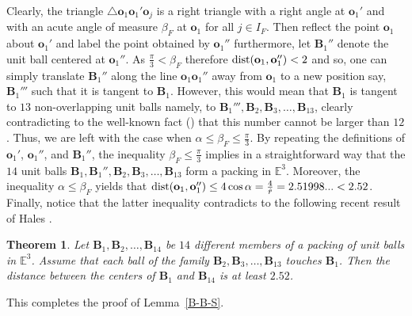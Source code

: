 \documentclass[10pt]{article}
\newtheorem{Theorem}{Theorem}
\numberwithin{Subcase}{Case}
\begin{document}
Clearly, the triangle $\triangle\mathbf{o}_1\mathbf{o}_1'\mathbf{o}_j$ is a right triangle with a right angle at $\mathbf{o}_1'$ and with an acute angle of measure $\beta_F$ at $\mathbf{o}_1$ for all $j\in I_F$. Then reflect the point $\mathbf{o}_1$ about $\mathbf{o}_1'$ and label the point obtained by $\mathbf{o}_1''$ furthermore, let $\mathbf{B}_1''$ denote the unit ball centered at $\mathbf{o}_1''$. As $\frac{\pi}{3}<\beta_F$ therefore ${\rm dist}(\mathbf{o}_1, \mathbf{o}_1'')<2$ and so, one can simply translate $\mathbf{B}_1''$ along the line $\mathbf{o}_1\mathbf{o}_1''$ away from $\mathbf{o}_1$ to a new position say, $\mathbf{B}_1'''$ such that it is tangent to $\mathbf{B}_1$. However, this would mean that $\mathbf{B}_1$ is tangent to $13$ non-overlapping unit balls namely, to $\mathbf{B}_1''', \mathbf{B}_2, \mathbf{B}_3, \dots , \mathbf{B}_{13}$, clearly contradicting to the well-known fact (\cite{SW}) that this number cannot be larger than $12$. Thus, we are left with the case when $\alpha\le\beta_F\le\frac{\pi}{3}$. By repeating the definitions of $\mathbf{o}_1'$, $\mathbf{o}_1''$, and $\mathbf{B}_1''$, the inequality $\beta_F\le\frac{\pi}{3}$ implies in a straightforward way that the $14$ unit balls $\mathbf{B}_1, \mathbf{B}_1'', \mathbf{B}_2, \mathbf{B}_3, \dots , \mathbf{B}_{13}$ form a packing in $\mathbb{E}^3$. Moreover, the inequality $\alpha\le\beta_F$ yields that
${\rm dist}(\mathbf{o}_1, \mathbf{o}_1'')\le4\cos\alpha=\frac{4}{\hat{r}}=2.51998... <2.52$. Finally, notice that the latter inequality contradicts to the following recent result of Hales \cite{H11}.

\begin{Theorem}\label{Hales}
Let $\mathbf{B}_1, \mathbf{B}_2, \dots , \mathbf{B}_{14}$ be $14$ different members of a packing of unit balls in $\mathbb{E}^3$. Assume that each ball of the family $\mathbf{B}_2, \mathbf{B}_3, \dots , \mathbf{B}_{13}$ touches $\mathbf{B}_1$. Then the distance between
the centers of $\mathbf{B}_1$ and $\mathbf{B}_{14}$ is at least $2.52$.
\end{Theorem}

This completes the proof of Lemma~\ref{B-B-S}.
\endproof  
\end{document}
